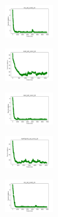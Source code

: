 \vspace*{\fill}
\newpage
\vspace*{\fill}

\begin{figure}[H]
    \centering
    \begin{subfigure}
        \centering
        \includegraphics[width=0.234\textwidth]{img/am01mej/iris_set_const_20_949004259_cost.png}
    \end{subfigure}
    \hfill
    \begin{subfigure}
        \centering
        \includegraphics[width=0.234\textwidth]{img/am01mej/ecoli_set_const_20_949004259_cost.png}
    \end{subfigure}
    \hfill
    \begin{subfigure}
        \centering
        \includegraphics[width=0.234\textwidth]{img/am01mej/rand_set_const_20_949004259_cost.png}
    \end{subfigure}
    \hfill
    \begin{subfigure}
        \centering
        \includegraphics[width=0.234\textwidth]{img/am01mej/newthyroid_set_const_20_949004259_cost.png}
    \end{subfigure}
    \hfill
    \begin{subfigure}
        \centering
        \includegraphics[width=0.234\textwidth]{img/am01mej/iris_set_const_20_589741062_cost.png}

\end{subfigure}
\end{figure}
